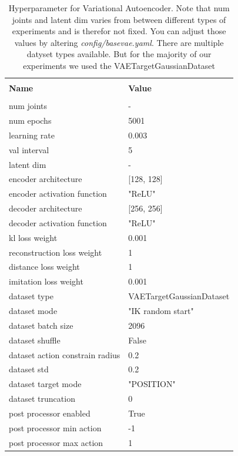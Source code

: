 \begin{table}[h]
    \label{tab:VAE_Hyperparameters}
    \begin{center}
        \begin{tabular}{ l | l }
        \hline \\
        \textbf{Name} & \textbf{Value} \\
        \hline \\
        num joints & - \\
        num epochs & 5001 \\
        learning rate & 0.003 \\
        val interval & 5 \\
        latent dim & - \\
        encoder architecture & [128, 128] \\
        encoder activation function & "ReLU" \\
        decoder architecture & [256, 256] \\
        decoder activation function & "ReLU" \\
        kl loss weight & 0.001 \\
        reconstruction loss weight & 1 \\
        distance loss weight & 1 \\
        imitation loss weight & 0.001 \\
        dataset type & VAETargetGaussianDataset \\
        dataset mode & "IK random start" \\
        dataset batch size & 2096 \\
        dataset shuffle & False \\
        dataset action constrain radius & 0.2 \\
        dataset std & 0.2 \\
        dataset target mode & "POSITION" \\
        dataset truncation & 0  \\
        post processor enabled & True \\
        post processor min action & -1 \\
        post processor max action & 1 
        \end{tabular}
    \end{center}
    \caption[VAE Hyperparameter]{Hyperparameter for Variational Autoencoder. Note that num joints and latent dim varies from between different types of experiments and is therefor not fixed. You can adjust those values by altering \textit{config/base\textunderscore vae.yaml}. There are multiple datyset types available. But for the majority of our experiments we used the VAETargetGaussianDataset}
\end{table}

